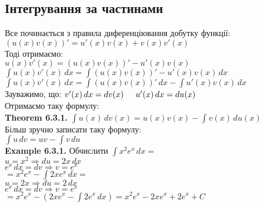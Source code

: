 \documentclass[a4paper, 14pt]{extarticle}
\def\huge{\displaystyle}
\def\bigline{\vspace{5mm}\\}
\def\ex#1{\textbf{Example {#1}}}
\def\th#1{\textbf{Theorem {#1}}}
\def\bigline{\vspace{5mm}\\}
\begin{document}
\subsection{Інтегрування за частинами}
Все починається з правила диференціювання добутку функції:\\
$(u(x)v(x))'=u'(x)v(x) + v(x)v'(x)$\\
Тоді отримаємо:\\
$u(x)v'(x) = (u(x)v(x))'-u'(x)v(x)$\\
$\huge \int u(x)v'(x) \,dx = \int (u(x)v(x))'-u'(x)v(x) \,dx$\\
$\huge \int u(x)v'(x) \,dx = \int (u(x)v(x))'\,dx - \int u'(x)v(x)\,dx$\\
Зауважимо, що: $v'(x)\,dx = dv(x) \hspace{0.5cm} u'(x)\,dx = du(x)$\\
Отримаємо таку формулу:\\
\th{6.3.1.} $\huge \int u(x)\,dv(x) = u(x)v(x) - \int v(x)\,du(x)$\\
Більш зручно записати таку формулу:\\
$\huge \int u\,dv = uv - \int v\,du$
\bigline
\ex{6.3.1.} Обчислити $\huge \int x^2 e^x \,dx = $\\
$u = x^2 \Rightarrow du = 2x\,dx$\\
$e^x\,dx = dv \Rightarrow v = e^x$\\
$= x^2 e^x - \huge \int 2x e^x\,dx =$\\
$u = 2x \Rightarrow du = 2\,dx$\\
$e^x\,dx = dv \Rightarrow v = e^x$\\
$= x^2 e^x - (2xe^x - \huge \int 2e^x \,dx) = x^2 e^x - 2xe^x + 2e^x + C$
\bigline
\end{document}
